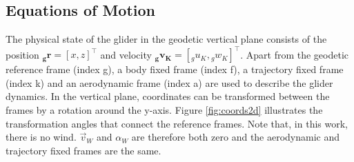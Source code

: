 \subsection{Equations of Motion}

The physical state of the glider in the geodetic vertical plane consists of the position $\boldsymbol{{}_g r}=[x,z]^\top$ and velocity $\boldsymbol{{}_g v_K}=[{}_g u_K,{}_g w_K]^\top$. Apart from the geodetic reference frame (index g), a body fixed frame (index f), a trajectory fixed frame (index k) and an aerodynamic frame (index a) are used to describe the glider dynamics. In the vertical plane, coordinates can be transformed between the frames by a rotation around the y-axis. Figure \ref{fig:coords2d} illustrates the transformation angles that connect the reference frames. Note that, in this work, there is no wind. $\vec{v}_W$ and $\alpha_W$ are therefore both zero and the aerodynamic and trajectory fixed frames are the same.


